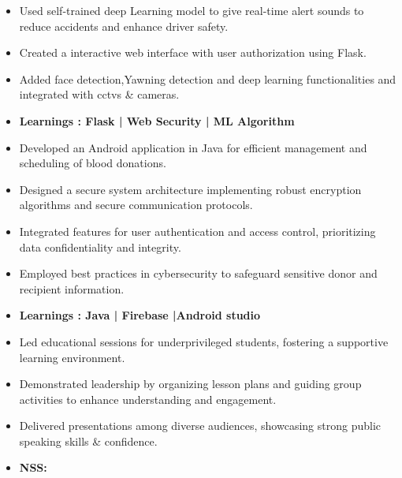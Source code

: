 


\begin{itemize}
\item Used self-trained deep Learning model to give real-time alert sounds to reduce accidents and enhance driver safety.
\item Created a interactive web interface with user authorization using Flask.
\item Added face detection,Yawning detection and deep learning functionalities and integrated with cctvs \& cameras.
\item\bf{Learnings }{: Flask | Web Security | ML Algorithm}
\end{itemize}
\smallskip
{}
\begin{itemize}
\item Developed an Android application in Java for efficient management and scheduling of blood donations.
\item Designed a secure system architecture implementing robust encryption algorithms and secure communication protocols.\
\item Integrated features for user authentication and access control, prioritizing data confidentiality and integrity.
\item Employed best practices in cybersecurity to safeguard sensitive donor and recipient information.
\item\bf{Learnings }{: Java | Firebase |Android studio }
\end{itemize}

\begin{itemize}
    \item  \normalfont Led educational sessions for underprivileged students, fostering a supportive learning environment.
    \item Demonstrated leadership by organizing lesson plans and guiding group activities to enhance understanding and engagement.
\item Delivered presentations among diverse audiences, showcasing strong public speaking skills \& confidence.
\item \bf{NSS:}
\end{itemize}


